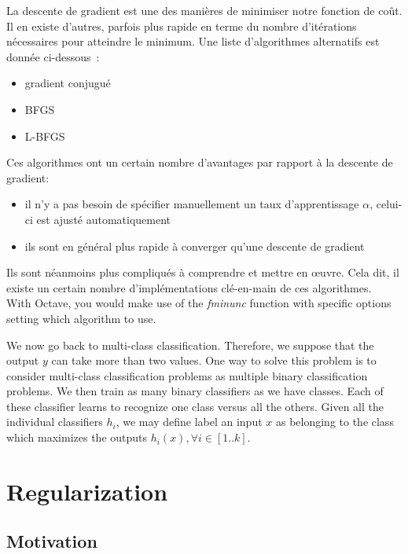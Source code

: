 \documentclass[10pt,a4paper]{article}
\begin{document}
La descente de gradient est une des manières de minimiser notre
fonction de coût. Il en existe d'autres, parfois plus rapide en terme
du nombre d'itérations nécessaires pour atteindre le minimum. Une
liste d'algorithmes alternatifs est donnée ci-dessous~:
\begin{itemize}
\item gradient conjugué
\item BFGS
\item L-BFGS
\end{itemize}
Ces algorithmes ont un certain nombre d'avantages par rapport à la
descente de gradient:
\begin{itemize}
\item il n'y a pas besoin de spécifier manuellement un taux
  d'apprentissage $\alpha$, celui-ci est ajusté automatiquement
\item ils sont en général plus rapide à converger qu'une descente de
  gradient
\end{itemize}
Ils sont néanmoins plus compliqués à comprendre et mettre en
{\oe}uvre. Cela dit, il existe un certain nombre d'implémentations
clé-en-main de ces algorithmes. \\

With Octave, you would make use of the \emph{fminunc} function with
specific options setting which algorithm to use.



We now go back to multi-class classification. Therefore, we suppose
that the output $y$ can take more than two values. One way to solve
this problem is to consider multi-class classification problems as
multiple binary classification problems. We then train as many binary
classifiers as we have classes. Each of these classifier learns to
recognize one class versus all the others. Given all the individual
classifiers $h_i$, we may define label an input $x$ as belonging to
the class which maximizes the outputs $h_i(x), \forall i \in
[1..k]$.\\

\section{Regularization}

\subsection{Motivation}
\end{document}
